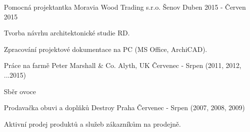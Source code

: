 \vspace{2pt}


\begin{cventries}

  \cventry
    {Pomocná projektantka} %
    {Moravia Wood Trading s.r.o.} %
    {Šenov} %
    {Duben 2015 - Červen 2015} %
    {
      \begin{cvitems} %
        \item {Tvorba návrhu architektonické studie RD.}
        \item {Zpracování projektové dokumentace na PC (MS Office, ArchiCAD).}
      \end{cvitems}
    }
   \cventry
   {Práce na farmě}
   {Peter Marshall \& Co.}
   {Alyth, UK}
   {Červenec - Srpen (2011, 2012, ...2015)}
   {
    \begin{cvitems}
      \item {Sběr ovoce}
    \end{cvitems}
   }
   \cventry
   {Prodavačka obuvi a doplňků}
   {Destroy}
   {Praha}
   {Červenec - Srpen (2007, 2008, 2009)}
   {
    \begin{cvitems}
      \item {Aktivní prodej produktů a služeb zákazníkům na prodejně.}
    \end{cvitems}
   }
  

\end{cventries}

